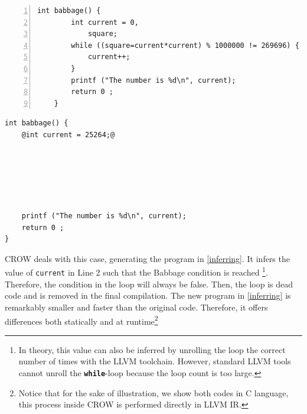 {


\begin{minipage}[t]{0.43\linewidth}
    \begin{lstlisting}[numbers=left]
    int babbage() {
        int current = 0,
            square;
        while ((square=current*current) % 1000000 != 269696) {
            current++;
        }
        printf ("The number is %d\n", current);
        return 0 ;
    }
    \end{lstlisting}
\end{minipage}\hfill
\begin{minipage}[t]{0.44\linewidth}
    \begin{lstlisting}[]
int babbage() {
    @int current = 25264;@
    
    




    printf ("The number is %d\n", current);
    return 0 ;
}
    \end{lstlisting}
\end{minipage}
}

CROW deals with this case, generating the program in \autoref{inferring}. It infers the value of \texttt{current} in Line 2 such that the Babbage condition is reached \footnote{
    In theory, this value can also be inferred by unrolling the loop the correct number of times with the LLVM toolchain.
    However, standard LLVM tools cannot unroll the \texttt{\textbf{while}}-loop because the loop count is too large.}. 
Therefore, the condition in the loop will always be false. Then, the loop is dead code and is removed in the final compilation. 
The new program in \autoref{inferring} is remarkably smaller and faster than the original code. Therefore, it offers differences both statically and at runtime\footnote{ Notice that for the sake of illustration, we show both codes in C language, this process inside CROW is performed directly in LLVM IR.}


